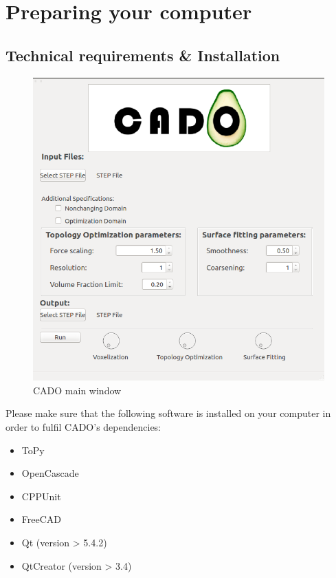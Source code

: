 \documentclass[
12pt, %
a4paper, %
oneside, %
headinclude,footinclude, %
BCOR5mm, %
]{scrartcl}
\begin{document}

\newpage %


\section{Preparing your computer}
\label{sec:prep}
\subsection{Technical requirements \& Installation}
\begin{figure}
\centering
\includegraphics[scale=0.4]{Pictures/CADO_mainWindow.png}
\caption{CADO main window}
\label{fig:mainWindow}
\end{figure}
Please make sure that the following software is installed on your computer in order to fulfil CADO's dependencies:
\begin{itemize}
\item ToPy
\item OpenCascade
\item CPPUnit
\item FreeCAD
\item Qt (version > 5.4.2)
\item QtCreator (version > 3.4) 
\end{itemize}
\end{document}
